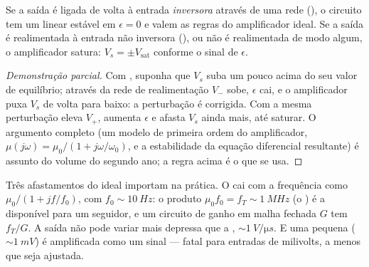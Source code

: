 \begin{proposition}\label{prop:b1:operational-amplifier:feedback}
Se a saída é ligada de volta à entrada \emph{inversora} através de uma
rede (), o circuito tem um  linear
estável em $\epsilon = 0$ e valem as regras do amplificador ideal. Se a
saída é realimentada à entrada não inversora (), ou
não é realimentada de modo algum, o amplificador satura: $V_s = \pm V_{\mathrm{sat}}$
conforme o sinal de $\epsilon$.
\end{proposition}

\begin{proof}[Demonstração parcial]
Com , suponha que $V_s$ suba um pouco acima do seu
valor de equilíbrio; através da rede de realimentação $V_-$ sobe, $\epsilon$
cai, e o amplificador puxa $V_s$ de volta para baixo: a perturbação é
corrigida. Com  a mesma perturbação eleva $V_+$,
aumenta $\epsilon$ e afasta $V_s$ ainda mais, até saturar.
O argumento completo (um modelo de primeira ordem do amplificador, $\mu(j\omega)
= \mu_0/(1 + j\omega/\omega_0)$, e a estabilidade da equação
diferencial resultante) é assunto do volume do segundo ano; a regra
acima é o que se usa.
\end{proof}

\begin{remark}\label{rem:b1:operational-amplifier:real}
Três afastamentos do ideal importam na prática. O 
cai com a frequência como $\mu_0/(1 + jf/f_0)$, com $f_0 \sim \qty{10}{Hz}$:
o produto $\mu_0 f_0 = f_T \sim \qty{1}{MHz}$ (o \emph{}) é a  disponível para um seguidor, e um circuito de
ganho em malha fechada $G$ tem  $f_T/G$. A saída não pode variar
mais depressa que a \emph{}, $\sim\qty{1}{V/\micro s}$. E uma
pequena \emph{} ($\sim\qty{1}{mV}$) é amplificada como
um sinal --- fatal para entradas de milivolts, a menos que seja ajustada.
\end{remark}

